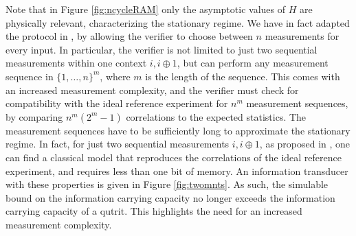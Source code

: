 Note that in Figure \ref{fig:ncycleRAM} only the asymptotic values of $H$ are physically relevant, characterizing the stationary regime. We have in fact adapted the protocol in \cite{Bharti2019}, by allowing the verifier to choose between $n$ measurements for every input. In particular, the verifier is not limited to just two sequential measurements within one context $i,i\oplus 1$, but can perform any measurement sequence in $\{1,\dots,n\}^m$, where $m$ is the length of the sequence. This comes with an increased measurement complexity, and the verifier must check for compatibility with the ideal reference experiment for $n^m$ measurement sequences, by comparing $n^m(2^m-1)$ correlations to the expected statistics. The measurement sequences have to be sufficiently long to approximate the stationary regime. In fact, for just two sequential measurements $i,i\oplus 1$, as proposed in \cite{Bharti2019}, one can find a classical model that reproduces the correlations of the ideal reference experiment, and requires less than one bit of memory. An information transducer with these properties is given in Figure \ref{fig:twomnts}. As such, the simulable bound on the information carrying capacity no longer exceeds the information carrying capacity of a qutrit. This highlights the need for an increased measurement complexity.

